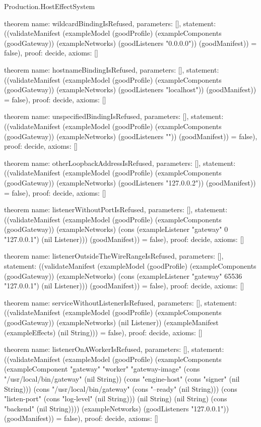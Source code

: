 \begin{lexlean}{Production.HostEffectSystem}
\begin{semanticmodule}
theorem{
  name: wildcardBindingIsRefused,
  parameters: [],
  statement: ((validateManifest (exampleModel (goodProfile) (exampleComponents (goodGateway)) (exampleNetworks) (goodListeners "0.0.0.0")) (goodManifest)) = false),
  proof: decide{},
  axioms: []
}

theorem{
  name: hostnameBindingIsRefused,
  parameters: [],
  statement: ((validateManifest (exampleModel (goodProfile) (exampleComponents (goodGateway)) (exampleNetworks) (goodListeners "localhost")) (goodManifest)) = false),
  proof: decide{},
  axioms: []
}

theorem{
  name: unspecifiedBindingIsRefused,
  parameters: [],
  statement: ((validateManifest (exampleModel (goodProfile) (exampleComponents (goodGateway)) (exampleNetworks) (goodListeners "")) (goodManifest)) = false),
  proof: decide{},
  axioms: []
}

theorem{
  name: otherLoopbackAddressIsRefused,
  parameters: [],
  statement: ((validateManifest (exampleModel (goodProfile) (exampleComponents (goodGateway)) (exampleNetworks) (goodListeners "127.0.0.2")) (goodManifest)) = false),
  proof: decide{},
  axioms: []
}

theorem{
  name: listenerWithoutPortIsRefused,
  parameters: [],
  statement: ((validateManifest (exampleModel (goodProfile) (exampleComponents (goodGateway)) (exampleNetworks) (cons (exampleListener "gateway" 0 "127.0.0.1") (nil Listener))) (goodManifest)) = false),
  proof: decide{},
  axioms: []
}

theorem{
  name: listenerOutsideTheWireRangeIsRefused,
  parameters: [],
  statement: ((validateManifest (exampleModel (goodProfile) (exampleComponents (goodGateway)) (exampleNetworks) (cons (exampleListener "gateway" 65536 "127.0.0.1") (nil Listener))) (goodManifest)) = false),
  proof: decide{},
  axioms: []
}

theorem{
  name: serviceWithoutListenerIsRefused,
  parameters: [],
  statement: ((validateManifest (exampleModel (goodProfile) (exampleComponents (goodGateway)) (exampleNetworks) (nil Listener)) (exampleManifest (exampleEffects) (nil String))) = false),
  proof: decide{},
  axioms: []
}

theorem{
  name: listenerOnAWorkerIsRefused,
  parameters: [],
  statement: ((validateManifest (exampleModel (goodProfile) (exampleComponents (exampleComponent "gateway" "worker" "gateway-image" (cons "/usr/local/bin/gateway" (nil String)) (cons "engine-host" (cons "signer" (nil String))) (cons "/usr/local/bin/gateway" (cons "--ready" (nil String))) (cons "listen-port" (cons "log-level" (nil String))) (nil String) (nil String) (cons "backend" (nil String)))) (exampleNetworks) (goodListeners "127.0.0.1")) (goodManifest)) = false),
  proof: decide{},
  axioms: []
}


\end{semanticmodule}
\end{lexlean}
